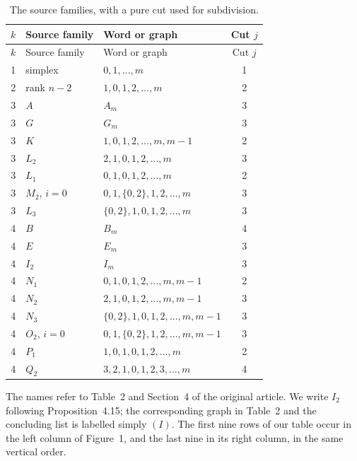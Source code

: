 \documentclass[11pt,a4paper]{article}
\begin{document}
\begin{longtable}{cllc}
\caption{The source families, with a pure cut used for subdivision.}
\label{families}\\
\toprule
$k$ & Source family & Word or graph & Cut $j$\\
\midrule\endfirsthead
\toprule $k$ & Source family & Word or graph & Cut $j$\\\midrule\endhead
1 & simplex & $0,1,\ldots,m$ & 1\\
2 & rank $n-2$ & $1,0,1,2,\ldots,m$ & 2\\
3 & $A$ & $A_m$ & 3\\
3 & $G$ & $G_m$ & 3\\
3 & $K$ & $1,0,1,2,\ldots,m,m-1$ & 2\\
3 & $L_2$ & $2,1,0,1,2,\ldots,m$ & 3\\
3 & $L_1$ & $0,1,0,1,2,\ldots,m$ & 2\\
3 & $M_2$, $i=0$ & $0,1,\{0,2\},1,2,\ldots,m$ & 3\\
3 & $L_3$ & $\{0,2\},1,0,1,2,\ldots,m$ & 3\\
4 & $B$ & $B_m$ & 4\\
4 & $E$ & $E_m$ & 3\\
4 & $I_2$ & $I_m$ & 3\\
4 & $N_1$ & $0,1,0,1,2,\ldots,m,m-1$ & 2\\
4 & $N_2$ & $2,1,0,1,2,\ldots,m,m-1$ & 3\\
4 & $N_3$ & $\{0,2\},1,0,1,2,\ldots,m,m-1$ & 3\\
4 & $O_2$, $i=0$ & $0,1,\{0,2\},1,2,\ldots,m,m-1$ & 3\\
4 & $P_1$ & $1,0,1,0,1,2,\ldots,m$ & 2\\
4 & $Q_2$ & $3,2,1,0,1,2,3,\ldots,m$ & 4\\
\bottomrule
\end{longtable}

The names refer to Table~2 and Section~4 of the original article.
We write $I_2$ following Proposition~4.15; the corresponding graph
in Table~2 and the concluding list is labelled simply $(I)$. The first nine rows of our table
occur in the left column of Figure~1, and the last nine in its right
column, in the same vertical order.
\end{document}
